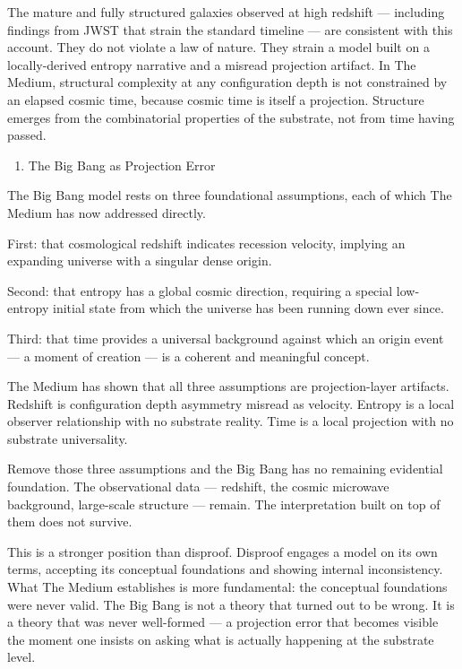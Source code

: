 \documentclass[11pt,letterpaper]{article}
\begin{document}
The mature and fully structured galaxies observed at high redshift — including findings from JWST that strain the standard timeline — are consistent with this account. They do not violate a law of nature. They strain a model built on a locally-derived entropy narrative and a misread projection artifact. In The Medium, structural complexity at any configuration depth is not constrained by an elapsed cosmic time, because cosmic time is itself a projection. Structure emerges from the combinatorial properties of the substrate, not from time having passed.


\begin{enumerate}
\item The Big Bang as Projection Error
\end{enumerate}

The Big Bang model rests on three foundational assumptions, each of which The Medium has now addressed directly.

First: that cosmological redshift indicates recession velocity, implying an expanding universe with a singular dense origin.

Second: that entropy has a global cosmic direction, requiring a special low-entropy initial state from which the universe has been running down ever since.

Third: that time provides a universal background against which an origin event — a moment of creation — is a coherent and meaningful concept.

The Medium has shown that all three assumptions are projection-layer artifacts. Redshift is configuration depth asymmetry misread as velocity. Entropy is a local observer relationship with no substrate reality. Time is a local projection with no substrate universality.

Remove those three assumptions and the Big Bang has no remaining evidential foundation. The observational data — redshift, the cosmic microwave background, large-scale structure — remain. The interpretation built on top of them does not survive.

This is a stronger position than disproof. Disproof engages a model on its own terms, accepting its conceptual foundations and showing internal inconsistency. What The Medium establishes is more fundamental: the conceptual foundations were never valid. The Big Bang is not a theory that turned out to be wrong. It is a theory that was never well-formed — a projection error that becomes visible the moment one insists on asking what is actually happening at the substrate level.
\end{document}
